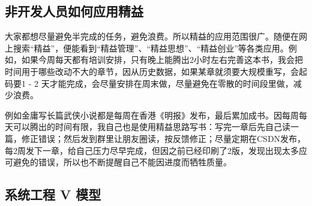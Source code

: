 
\hypertarget{ux975eux5f00ux53d1ux4ebaux5458ux5982ux4f55ux5e94ux7528ux7cbeux76ca}{%
\subsection{非开发人员如何应用精益}\label{ux975eux5f00ux53d1ux4ebaux5458ux5982ux4f55ux5e94ux7528ux7cbeux76ca}}

大家都想尽量避免半完成的任务，避免浪费。所以精益的应用范围很广。随便在网上搜索``精益''，便能看到``精益管理''、``精益思想''、``精益创业''等各类应用。例如，如果今周每天都有培训安排，只有晚上能腾出2小时左右完善这本书，我会把时间用于哪些改动不大的章节，因从历史数据，如果某章就须要大规模重写，会起码要1
- 2
天才能完成，会尽量安排在周末做，尽量避免在零散的时间段里做，减少浪费。

例如金庸写长篇武侠小说都是每周在香港《明报》发布，最后累加成书。因每周每天可以腾出的时间有限，我自己也是使用精益思路写书：写完一章后先自己读一篇，修正错误；然后发到群里让朋友圈读，按反馈修正；尽量定期在CSDN发布，每2周发下一章，给自己压力尽早完成，但因之前已经印刷了2版，发现出现太多应可避免的错误，所以也不断提醒自己不能因进度而牺牲质量。

\hypertarget{ux7cfbux7edfux5de5ux7a0b-v-ux6a21ux578b}{%
\subsection{系统工程 V
模型}\label{ux7cfbux7edfux5de5ux7a0b-v-ux6a21ux578b}}

